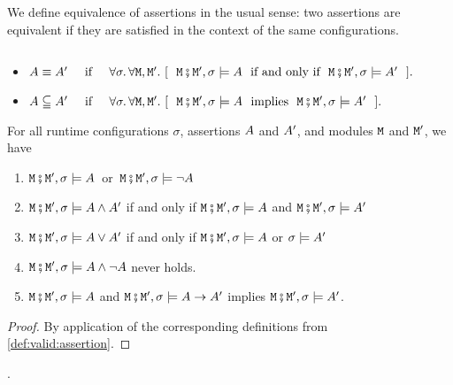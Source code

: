 We define equivalence of   assertions in the usual sense: two assertions are equivalent if they are satisfied  in
the context of the same configurations.

\begin{definition} 
$ ~ $ 

\begin{itemize}
\item
$\A \equiv \A'\  \IFF\    \forall \sigma.\, \forall \M, \M'. \ [\ \ \M\mkpair \M', \sigma \models \A\ \mbox{ if and only if }\ \M\mkpair \M', \sigma \models \A'\ \ ].$
\item
$\A \subseteqq \A'\  \IFF\    \forall \sigma.\, \forall \M, \M'. \ [\ \ \M\mkpair \M', \sigma \models \A\ \mbox{ implies }\ \M\mkpair \M', \sigma \models \A'\ \ ].$
\end{itemize}
\end{definition}

 

\begin{lemma}
For all runtime configurations $\sigma$,    assertions $\A$ and $\A'$, and modules $\M$  and $\M'$, we have
\begin{enumerate}
\item 
$\M\mkpair \M', \sigma \models \A$\ or\ $\M\mkpair \M', \sigma \models \neg\A$
\item
$\M\mkpair \M', \sigma  \models \A \wedge \A'$ \SP if and only if \SP $\M\mkpair \M', \sigma \models \A$ and $\M\mkpair \M', \sigma  \models \A'$ 
\item
$\M\mkpair \M', \sigma  \models \A \vee \A'$ \SP if and only if \SP $\M\mkpair \M', \sigma  \models \A$ or  $\sigma \models \A'$ 
\item
$\M\mkpair \M', \sigma  \models \A \wedge \neg\A$ never holds.
\item
$\M\mkpair \M', \sigma  \models \A$ and  $\M\mkpair \M', \sigma  \models \A \rightarrow \A'$  implies 
$\M\mkpair \M', \sigma  \models \A '$. 
\end{enumerate}
\end{lemma}
\begin{proof} By application of the corresponding definitions from \ref{def:valid:assertion}.\end{proof}.

